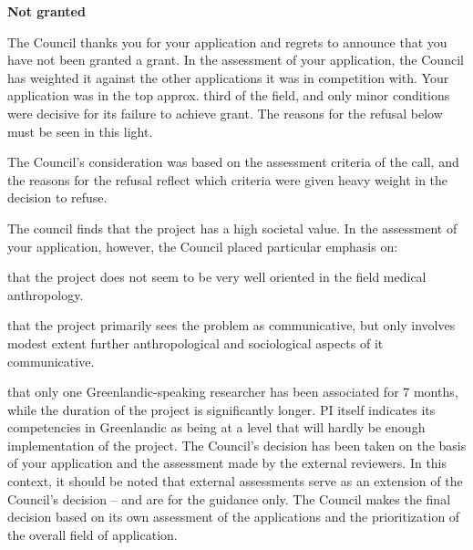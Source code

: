\documentclass[twocolumn, issue, rga, authordate]{jote-new-article}
\begin{document}
\textbf{Not granted}


The Council thanks you for your application and regrets to announce that you have not been granted a grant. In the assessment of your application, the Council has weighted it against the other applications it was in competition with. Your application was in the top approx.
third of the field, and only minor conditions were decisive for its failure to achieve grant. The reasons for the refusal below must be seen in this light.

The Council's consideration was based on the assessment criteria of the call, and the reasons for the refusal reflect which criteria were given heavy weight in the decision to refuse.

The council finds that the project has a high societal value. In the assessment of your application, however, the Council placed particular emphasis on:

that the project does not seem to be very well oriented in the field medical anthropology.

that the project primarily sees the problem as communicative, but only involves modest extent further anthropological and sociological aspects of it communicative.

that only one Greenlandic-speaking researcher has been associated for 7 months, while the duration of the project is significantly longer. PI itself indicates its competencies in Greenlandic as being at a level that will hardly be enough implementation of the project.
\balance
The Council's decision has been taken on the basis of your application and the assessment made by the external reviewers. In this context, it should be noted that external assessments serve as an extension of the Council's decision -- and are for the guidance only. The Council makes the final decision based on its own assessment of the applications and the prioritization of the overall field of application.


\nocite{*}

\printbibliography
\end{document}
